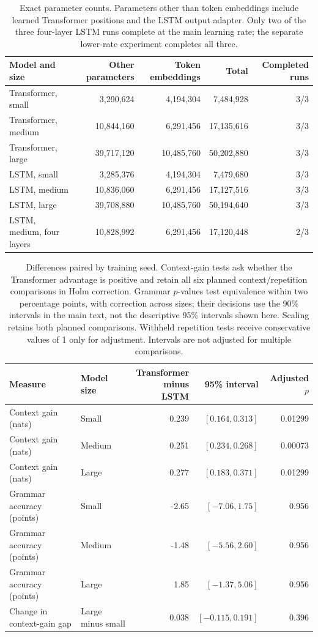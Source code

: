 \documentclass[10pt]{article}
\begin{document}
\begin{table}[ht]
\centering
\small
\begin{tabular}{lrrrr}
\toprule
Model and size & Other parameters & Token embeddings & Total & Completed runs \\
\midrule
Transformer, small & 3,290,624 & 4,194,304 & 7,484,928 & 3/3 \\
Transformer, medium & 10,844,160 & 6,291,456 & 17,135,616 & 3/3 \\
Transformer, large & 39,717,120 & 10,485,760 & 50,202,880 & 3/3 \\
LSTM, small & 3,285,376 & 4,194,304 & 7,479,680 & 3/3 \\
LSTM, medium & 10,836,060 & 6,291,456 & 17,127,516 & 3/3 \\
LSTM, large & 39,708,880 & 10,485,760 & 50,194,640 & 3/3 \\
LSTM, medium, four layers & 10,828,992 & 6,291,456 & 17,120,448 & 2/3 \\
\bottomrule
\end{tabular}
\caption{Exact parameter counts. Parameters other than token embeddings include learned Transformer positions and the LSTM output adapter. Only two of the three four-layer LSTM runs complete at the main learning rate; the separate lower-rate experiment completes all three.}
\label{tab:exactcounts}
\end{table}

\begin{table}[ht]
\centering
\small
\begin{tabular}{llrrr}
\toprule
Measure & Model size & \shortstack{Transformer\\minus LSTM} & 95\% interval & Adjusted $p$ \\
\midrule
Context gain (nats) & Small & 0.239 & $[0.164,0.313]$ & 0.01299 \\
Context gain (nats) & Medium & 0.251 & $[0.234,0.268]$ & 0.00073 \\
Context gain (nats) & Large & 0.277 & $[0.183,0.371]$ & 0.01299 \\
Grammar accuracy (points) & Small & -2.65 & $[-7.06,1.75]$ & 0.956 \\
Grammar accuracy (points) & Medium & -1.48 & $[-5.56,2.60]$ & 0.956 \\
Grammar accuracy (points) & Large & 1.85 & $[-1.37,5.06]$ & 0.956 \\
Change in context-gain gap & Large minus small & 0.038 & $[-0.115,0.191]$ & 0.396 \\
\bottomrule
\end{tabular}
\caption{Differences paired by training seed. Context-gain tests ask whether the Transformer advantage is positive and retain all six planned context/repetition comparisons in Holm correction. Grammar $p$-values test equivalence within two percentage points, with correction across sizes; their decisions use the 90\% intervals in the main text, not the descriptive 95\% intervals shown here. Scaling retains both planned comparisons. Withheld repetition tests receive conservative values of 1 only for adjustment. Intervals are not adjusted for multiple comparisons.}
\label{tab:inference}
\end{table}
\end{document}
